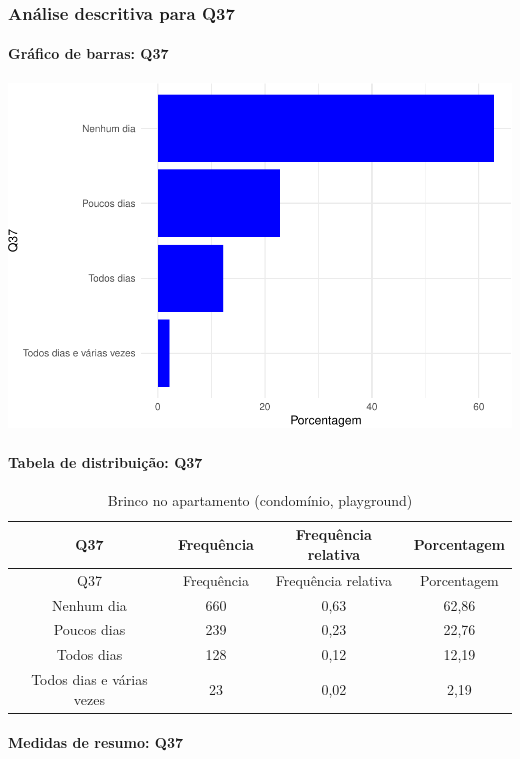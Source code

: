 \documentclass[]{article}
\let\oldparagraph\paragraph
\renewcommand{\paragraph}[1]{\oldparagraph{#1}\mbox{}}
\begin{document}
\hypertarget{anuxe1lise-descritiva-para-q37}{%
\subsubsection{Análise descritiva para Q37}\label{anuxe1lise-descritiva-para-q37}}

\hypertarget{gruxe1fico-de-barras-q37}{%
\paragraph{Gráfico de barras: Q37}\label{gruxe1fico-de-barras-q37}}

\begin{center}\includegraphics[width=0.75\linewidth]{relatorio_covid19_files/figure-latex/unnamed-chunk-1367-1} \end{center}

\hypertarget{tabela-de-distribuiuxe7uxe3o-q37}{%
\paragraph{Tabela de distribuição: Q37}\label{tabela-de-distribuiuxe7uxe3o-q37}}

\begin{longtable}[]{@{}cccc@{}}
\caption{\label{tab:unnamed-chunk-1368}Brinco no apartamento (condomínio, playground)}\tabularnewline
\toprule
Q37 & Frequência & Frequência relativa & Porcentagem\tabularnewline
\midrule
\endfirsthead
\toprule
Q37 & Frequência & Frequência relativa & Porcentagem\tabularnewline
\midrule
\endhead
Nenhum dia & 660 & 0,63 & 62,86\tabularnewline
Poucos dias & 239 & 0,23 & 22,76\tabularnewline
Todos dias & 128 & 0,12 & 12,19\tabularnewline
Todos dias e várias vezes & 23 & 0,02 & 2,19\tabularnewline
\bottomrule
\end{longtable}

\hypertarget{medidas-de-resumo-q37}{%
\paragraph{Medidas de resumo: Q37}\label{medidas-de-resumo-q37}}
\end{document}

